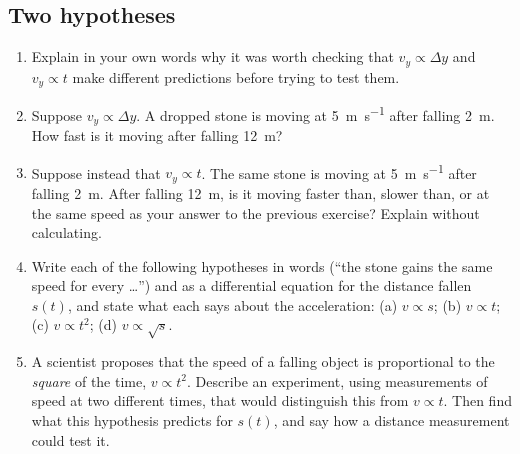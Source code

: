 \documentclass[11pt,twoside,openany]{book}
\newcounter{check}[chapter]
\begin{document}
\subsection*{Two hypotheses}
\begin{enumerate}[label=\textbf{\thechapter.\arabic*},series=exercises,leftmargin=*]
  \item Explain in your own words why it was worth checking that $v_y \propto \Delta y$ and $v_y \propto t$ make different predictions before trying to test them.
  \item Suppose $v_y \propto \Delta y$. A dropped stone is moving at \SI{5}{\metre\per\second} after falling \SI{2}{\metre}. How fast is it moving after falling \SI{12}{\metre}?
  \item Suppose instead that $v_y \propto t$. The same stone is moving at \SI{5}{\metre\per\second} after falling \SI{2}{\metre}. After falling \SI{12}{\metre}, is it moving faster than, slower than, or at the same speed as your answer to the previous exercise? Explain without calculating.
  \item Write each of the following hypotheses in words (``the stone gains the same speed for every \ldots'') and as a differential equation for the distance fallen $s(t)$, and state what each says about the acceleration: (a) $v \propto s$; (b) $v \propto t$; (c) $v \propto t^2$; (d) $v \propto \sqrt{s}$.
  \item A scientist proposes that the speed of a falling object is proportional to the \emph{square} of the time, $v \propto t^2$. Describe an experiment, using measurements of speed at two different times, that would distinguish this from $v \propto t$. Then find what this hypothesis predicts for $s(t)$, and say how a distance measurement could test it.
\end{enumerate}
\end{document}
